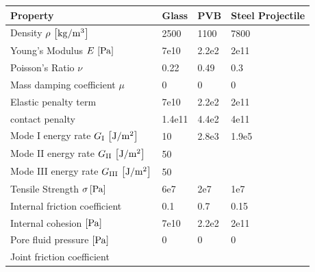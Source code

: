 \documentclass[12pt,twoside]{article}
\theoremstyle{break}
\begin{document}
\begin{table}[!htbp]
  \begin{tabular}{llll}
    Property                                                & Glass             & PVB                   & Steel Projectile  \\\midrule            
    Density $\rho\,\left[{\rm{kg}} / {\rm{m}}^3\right]$     & 2500 \cite{Xu10}  & 1100 \cite{Xu10}      & 7800 \cite{Che18} \\
    Young's Modulus $E\,\left[{\rm{Pa}}\right]$             & 7e10 \cite{Xu10}  & 2.2e2 \cite{Ved17}    & 2e11 \cite{Che18} \\
    Poisson's Ratio $\nu$                                   & 0.22 \cite{Xu10}  & 0.49 \cite{Che15}     & 0.3 \cite{Che18}  \\
    Mass damping coefficient $\mu$                          & 0                 & 0                     & 0                 \\
    Elastic penalty term                                    & 7e10              & 2.2e2                 & 2e11              \\
    contact penalty                                         & 1.4e11            & 4.4e2                 & 4e11              \\
    Mode I energy rate $G_{\rm{I}}\,\left[{\rm{J}}/{\rm{m}}^2\right]$     & 10 \cite{Xu10}    &  2.8e3 \cite{Hoo17}    & 1.9e5 \cite{Sta00}\\
    Mode II energy rate $G_{\rm{II}}\,\left[{\rm{J}}/{\rm{m}}^2\right]$   & 50 \cite{Xu10}    &                       &     \\
    Mode III energy rate $G_{\rm{III}}\,\left[{\rm{J}}/{\rm{m}}^2\right]$ & 50 \cite{Xu10}    &                       &     \\
    Tensile Strength $\sigma \left[{\rm{Pa}}\right]$        & 6e7 \cite{Che15}  & 2e7 \cite{Zan12}      & 1e7 \cite{Wu14}   \\
    Internal friction coefficient                           & 0.1 \cite{Che15}  & 0.7 \cite{Kun15}      & 0.15 \cite{Sah07} \\
    Internal cohesion $\left[{\rm{Pa}}\right]$              & 7e10              & 2.2e2                 & 2e11              \\
    Pore fluid pressure $\left[{\rm{Pa}}\right]$            & 0                 & 0                     & 0                 \\
    Joint friction coefficient                              &                   &                       &                   \\

\end{tabular}
\end{table}
\end{document}
